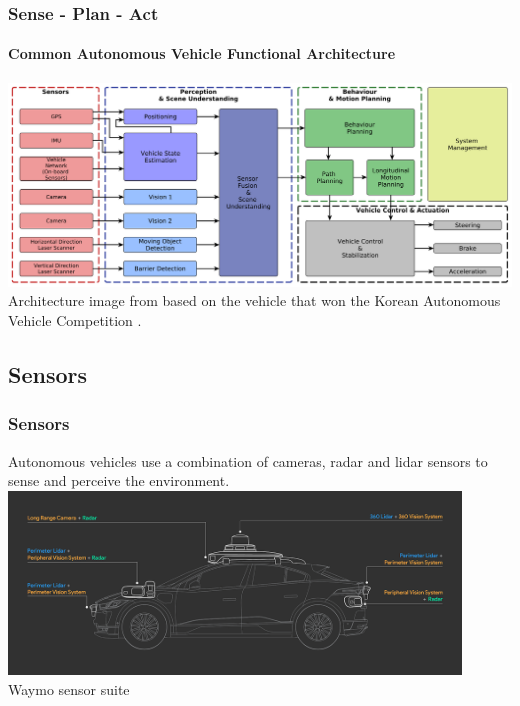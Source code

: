 \begin{frame}
\frametitle{Sense - Plan - Act}
\framesubtitle{Common Autonomous Vehicle Functional Architecture}
\includegraphics[width=\textwidth]{images/tas_2016_fig4_av_functional_architecture.png}
\tiny{Architecture image from \cite{Tas2016-sd} based on the vehicle that won the
Korean Autonomous Vehicle Competition \cite{Jo2014-na}}.
\end{frame}

\subsection{Sensors}

\begin{frame}
\frametitle{Sensors}
Autonomous vehicles use a combination of cameras, radar and lidar sensors to
sense and perceive the environment.\\
\vspace{0.25cm}
\centering
\includegraphics[width=0.9\textwidth]{images/waymo_sensors.png}\\
\footnotesize{Waymo sensor suite\footnotemark[1]}
\end{frame}

